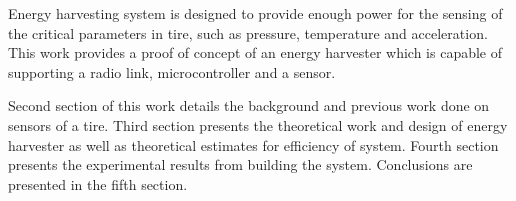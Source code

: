 Energy harvesting system is designed to provide enough power for the sensing of the critical parameters in tire, such as pressure, temperature and acceleration. This work provides a proof of concept of an energy harvester which is capable of supporting a radio link, microcontroller and a sensor. 

Second section of this work details the background and previous work done on sensors of a tire. Third section presents the theoretical work and design of energy harvester as well as theoretical estimates for efficiency of system. Fourth section presents the experimental results from building the system. Conclusions are presented in the fifth section.

